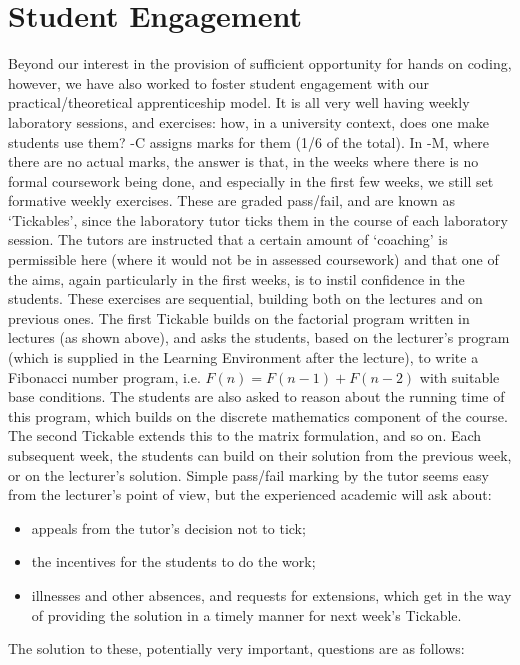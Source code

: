 \documentclass[conference,compsoc]{IEEEtran}
\begin{document}
\section{Student Engagement}
Beyond our interest in the provision of sufficient opportunity for hands on coding, however, we have also worked to foster student engagement with our practical/theoretical apprenticeship model. It is all very well having weekly laboratory sessions, and exercises: how, in a university context, does one make students use them? \Bath-C{} assigns marks for them (1/6 of the total).
In \Bath-M, where there are no actual marks, the answer is that, in the weeks where there is no formal coursework being done, and especially in the first few weeks, we still set formative weekly exercises. These are graded pass/fail, and are known as `Tickables', since the laboratory tutor ticks them in the course of each laboratory session. The tutors are instructed that a certain amount of `coaching' is permissible here (where it would not be in assessed coursework) and that one of the aims, again particularly in the first weeks, is to instil confidence in the students.
These exercises are sequential, building both on the lectures and on previous ones. The first Tickable builds on the factorial program written in lectures (as shown above), and asks the students, based on the lecturer's program (which is supplied in the Learning Environment after the lecture), to write a Fibonacci number program, i.e. $F(n)=F(n-1)+F(n-2)$ with suitable base conditions. The students are also asked to reason about the running time of this program, which builds on the discrete mathematics component of the course. The second Tickable extends this to the matrix formulation, and so on. Each subsequent week, the students can build on their solution from the previous week, or on the lecturer's solution.
Simple pass/fail marking by the tutor seems easy from the lecturer's point of view, but the experienced academic will ask about:
\begin{itemize}
\item appeals from the tutor's decision not to tick;
\item the incentives for the students to do the work;
\item illnesses and other absences, and requests for extensions, which get in the way of providing the solution in a timely manner for next week's Tickable.
\end{itemize}
The \BathM{} solution to these, potentially very important, questions are as follows:
\end{document}
